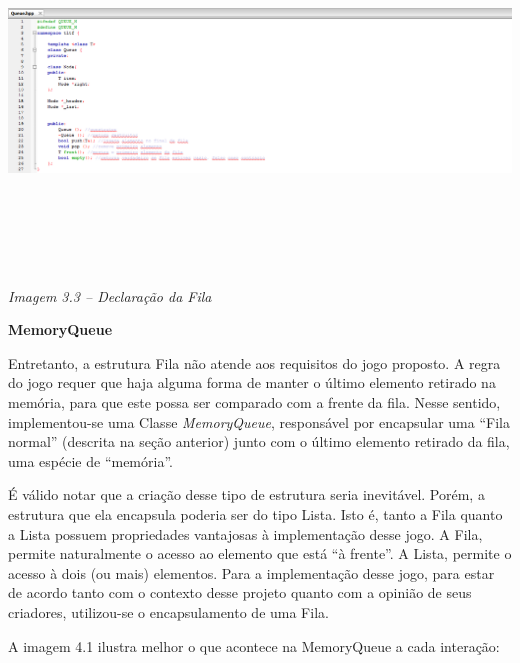 \documentclass[a4paper]{article}
\newcounter{Imagem2}
\newcounter{Imagem1}
\begin{document}
{\centering 
\includegraphics[width=5.9402in,height=3.698in]{T1-img13.png} \par}

{\centering
\textit{\textcolor[rgb]{0.34901962,0.34901962,0.34901962}{Imagem 3.3 –
Declaração da Fila}}
\par}


\bigskip

\textbf{MemoryQueue}

Entretanto, a estrutura Fila não atende aos requisitos do jogo proposto.
A regra do jogo requer que haja alguma forma de manter o último
elemento retirado na memória, para que este possa ser comparado com a
frente da fila. Nesse sentido, implementou-se uma Classe
\textit{MemoryQueue}, responsável por encapsular uma “Fila normal”
(descrita na seção anterior) junto com o último elemento retirado da
fila, uma espécie de “memória”.

É válido notar que a criação desse tipo de estrutura seria inevitável.
Porém, a estrutura que ela encapsula poderia ser do tipo Lista. Isto é,
tanto a Fila quanto a Lista possuem propriedades vantajosas à
implementação desse jogo. A Fila, permite naturalmente o acesso ao
elemento que está “à frente”. A Lista, permite o acesso à dois (ou
mais) elementos. Para a implementação desse jogo, para estar de acordo
tanto com o contexto desse projeto quanto com a opinião de seus
criadores, utilizou-se o encapsulamento de uma Fila.

A imagem 4.1 ilustra melhor o que acontece na MemoryQueue a cada
interação:


\bigskip
\end{document}
